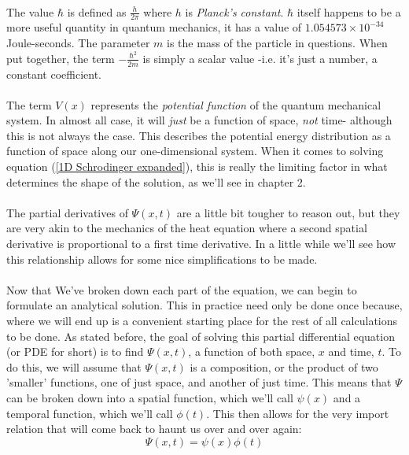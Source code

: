 \documentclass[12pt,letterpaper]{book}
\begin{document}
\paragraph*{}The value $\hbar$ is defined as $\frac{h}{2\pi}$ where $h$ is \textit{Planck's constant}. $\hbar$ itself happens to be a more useful quantity in quantum mechanics, it has a value of $1.054573\times 10^{-34}$ Joule-seconds. The parameter $m$ is the mass of the particle in questions. When put together, the term $-\frac{\hbar^2}{2m}$ is simply a scalar value -i.e. it's just a number, a constant coefficient.
\paragraph*{}The term $V(x)$ represents the \textit{potential function} of the quantum mechanical system. In almost all case, it will \textit{just} be a function of space, \textit{not} time- although this is not always the case. This describes the potential energy distribution as a function of space along our one-dimensional system. When it comes to solving equation (\ref{1D Schrodinger expanded}), this is really the limiting factor in what determines the shape of the solution, as we'll see in chapter 2.
\paragraph*{}The partial derivatives of $\Psi(x,t)$ are a little bit tougher to reason out, but they are very akin to the mechanics of the heat equation where a second spatial derivative is proportional to a first time derivative. In a little while we'll see how this relationship allows for some nice simplifications to be made.
\paragraph*{}Now that We've broken down each part of the equation, we can begin to formulate an analytical solution. This in practice need only be done once because, where we will end up is a convenient starting place for the rest of all calculations to be done. As stated before, the goal of solving this partial differential equation (or PDE for short) is to find $\Psi(x,t)$, a function of both space, $x$ and time, $t$. To do this, we will assume that $\Psi(x,t)$ is a composition, or the product of two 'smaller' functions, one of just space, and another of just time. This means that $\Psi$ can be broken down into a spatial function, which we'll call $\psi(x)$ and a temporal function, which we'll call $\phi(t)$. This then allows for the very import relation that will come back to haunt us over and over again:
\begin{equation}
\label{separable}
\Psi(x,t) = \psi(x)\phi(t)
\end{equation}
\end{document}
